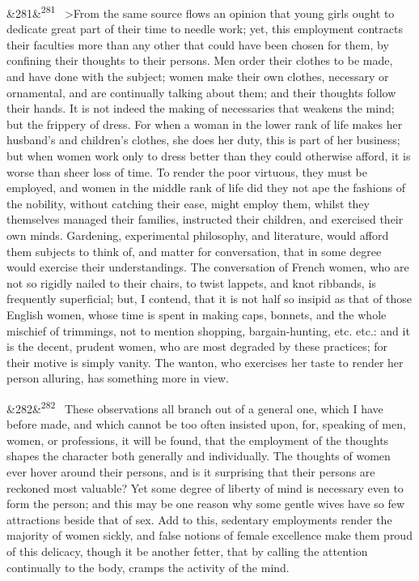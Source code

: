 \documentclass[12pt]{article}
\newcommand{\para}[1][]{\par\noindent\ifx&#1&\else\textsuperscript{\footnotesize #1}~\fi}
\begin{document}
\para[281] >From the same source flows an opinion that young girls ought to dedicate great part of their time to needle work; yet, this employment contracts their faculties more than any other that could have been chosen for them, by confining their thoughts to their persons. Men order their clothes to be made, and have done with the subject; women make their own clothes, necessary or ornamental, and are continually talking about them; and their thoughts follow their hands. It is not indeed the making of necessaries that weakens the mind; but the frippery of dress. For when a woman in the lower rank of life makes her husband's and children's clothes, she does her duty, this is part of her business; but when women work only to dress better than they could otherwise afford, it is worse than sheer loss of time. To render the poor virtuous, they must be employed, and women in the middle rank of life did they not ape the fashions of the nobility, without catching their ease, might employ them, whilst they themselves managed their families, instructed their children, and exercised their own minds. Gardening, experimental philosophy, and literature, would afford them subjects to think of, and matter for conversation, that in some degree would exercise their understandings. The conversation of French women, who are not so rigidly nailed to their chairs, to twist lappets, and knot ribbands, is frequently superficial; but, I contend, that it is not half so insipid as that of those English women, whose time is spent in making caps, bonnets, and the whole mischief of trimmings, not to mention shopping, bargain-hunting, etc. etc.: and it is the decent, prudent women, who are most degraded by these practices; for their motive is simply vanity. The wanton, who exercises her taste to render her person alluring, has something more in view.

\para[282] These observations all branch out of a general one, which I have before made, and which cannot be too often insisted upon, for, speaking of men, women, or professions, it will be found, that the employment of the thoughts shapes the character both generally and individually. The thoughts of women ever hover around their persons, and is it surprising that their persons are reckoned most valuable? Yet some degree of liberty of mind is necessary even to form the person; and this may be one reason why some gentle wives have so few attractions beside that of sex. Add to this, sedentary employments render the majority of women sickly, and false notions of female excellence make them proud of this delicacy, though it be another fetter, that by calling the attention continually to the body, cramps the activity of the mind.
\end{document}
